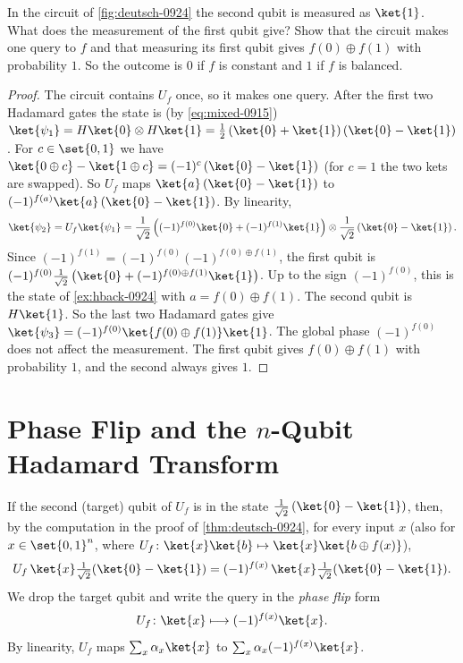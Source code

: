 \begin{exercisebox}
\begin{exercise}\label{ex:deutsch-0924}\label{thm:deutsch-0924}
    In the circuit of \cref{fig:deutsch-0924} the second qubit is measured as $\ket{1}$. What does
    the measurement of the first qubit give? Show that the circuit makes one query to $f$ and that
    measuring its first qubit gives $f(0) \oplus f(1)$ with probability $1$. So the outcome is $0$
    if $f$ is constant and $1$ if $f$ is balanced.
\end{exercise}
\tcblower
\begin{proof}
    The circuit contains $U_f$ once, so it makes one query.
    After the first two Hadamard gates the state is (by \cref{eq:mixed-0915})
    $\ket{\psi_1} = H\ket{0} \otimes H\ket{1}
        = \frac{1}{2}\left(\ket{0} + \ket{1}\right)\left(\ket{0} - \ket{1}\right)$.
    For $c \in \set{0,1}$ we have
    $\ket{0 \oplus c} - \ket{1 \oplus c} = (-1)^{c}\left(\ket{0} - \ket{1}\right)$ (for $c = 1$ the two
    kets are swapped). So $U_f$ maps $\ket{a}\left(\ket{0} - \ket{1}\right)$ to
    $(-1)^{f(a)} \ket{a}\left(\ket{0} - \ket{1}\right)$. By linearity,
    \[\ket{\psi_2} = U_f \ket{\psi_1}
        = \frac{1}{\sqrt{2}}\left((-1)^{f(0)}\ket{0} + (-1)^{f(1)}\ket{1}\right)
        \otimes \frac{1}{\sqrt{2}}\left(\ket{0} - \ket{1}\right).\]
    Since $(-1)^{f(1)} = (-1)^{f(0)} (-1)^{f(0) \oplus f(1)}$, the first qubit is
    $(-1)^{f(0)} \frac{1}{\sqrt{2}}\left(\ket{0} + (-1)^{f(0) \oplus f(1)}\ket{1}\right)$. Up to the
    sign $(-1)^{f(0)}$, this is the state of \cref{ex:hback-0924} with $a = f(0) \oplus f(1)$. The
    second qubit is $H\ket{1}$. So the last two Hadamard gates give
    $\ket{\psi_3} = (-1)^{f(0)} \ket{f(0) \oplus f(1)} \ket{1}$.
    The global phase $(-1)^{f(0)}$ does not affect the measurement. The first qubit gives
    $f(0) \oplus f(1)$ with probability $1$, and the second always gives $1$.
\end{proof}
\end{exercisebox}

\section{Phase Flip and the \texorpdfstring{$n$}{n}-Qubit Hadamard Transform}

If the second (target) qubit of $U_f$ is in the state
$\frac{1}{\sqrt{2}}\left(\ket{0} - \ket{1}\right)$, then, by the computation in the proof of
\cref{thm:deutsch-0924}, for every input $x$ (also for $x \in \set{0,1}^n$, where
$U_f \colon \ket{x}\ket{b} \mapsto \ket{x}\ket{b \oplus f(x)}$),
\[U_f \, \ket{x} \tfrac{1}{\sqrt{2}}(\ket{0} - \ket{1}) = (-1)^{f(x)} \, \ket{x} \tfrac{1}{\sqrt{2}}(\ket{0} - \ket{1}).\]
We drop the target qubit and write the query in the \emph{phase flip} form
\[U_f \colon \ket{x} \longmapsto (-1)^{f(x)} \ket{x}.\]
By linearity, $U_f$ maps $\sum_x \alpha_x \ket{x}$ to $\sum_x \alpha_x (-1)^{f(x)} \ket{x}$.

